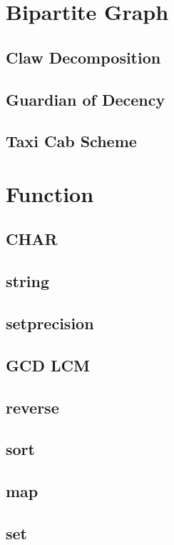 \section{Bipartite Graph}
        \subsection{Claw Decomposition}
                
        \subsection{Guardian of Decency}
                
        \subsection{Taxi Cab Scheme}
                

\section{Function}
        \subsection{CHAR}
                
        \subsection{string}
                
        \subsection{setprecision}
                
        \subsection{GCD LCM}
                
        \subsection{reverse}
                
        \subsection{sort}
                
        \subsection{map}
                
        \subsection{set}
                